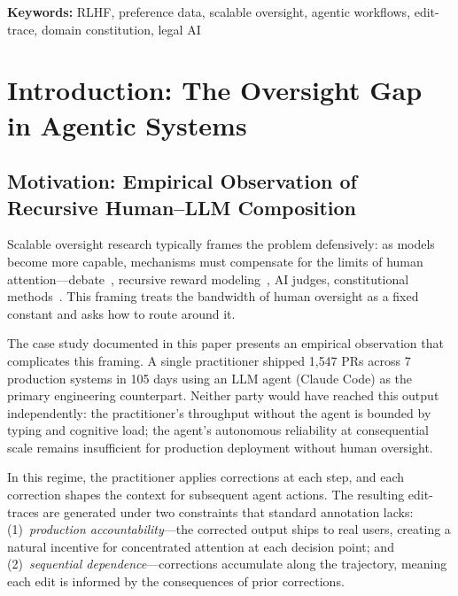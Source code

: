\documentclass[11pt]{article}
\begin{document}
\begin{abstract}
The methodology rests on a simple empirical claim: a single practitioner working recursively with an LLM, under product accountability, completes long-horizon work that neither party completes alone.
Edit-traces in this regime are dense, outcome-validated, and impossible to obtain through annotation in isolation.
\end{abstract}

\vspace{0.5em}
\noindent\textbf{Keywords:} RLHF, preference data, scalable oversight, agentic workflows, edit-trace, domain constitution, legal AI

\section{Introduction: The Oversight Gap in Agentic Systems}
\label{sec:intro}

\subsection{Motivation: Empirical Observation of Recursive Human--LLM Composition}
\label{sec:motivation}

Scalable oversight research typically frames the problem defensively: as models become more capable, mechanisms must compensate for the limits of human attention---debate~\citep{irving2018ai}, recursive reward modeling~\citep{leike2018scalable}, AI judges, constitutional methods~\citep{christiano2017deep, bai2022constitutional}.
This framing treats the bandwidth of human oversight as a fixed constant and asks how to route around it.

The case study documented in this paper presents an empirical observation that complicates this framing.
A single practitioner shipped 1{,}547 PRs across 7 production systems in 105 days using an LLM agent (Claude Code) as the primary engineering counterpart.
Neither party would have reached this output independently: the practitioner's throughput without the agent is bounded by typing and cognitive load; the agent's autonomous reliability at consequential scale remains insufficient for production deployment without human oversight.

In this regime, the practitioner applies corrections at each step, and each correction shapes the context for subsequent agent actions.
The resulting edit-traces are generated under two constraints that standard annotation lacks:
(1)~\emph{production accountability}---the corrected output ships to real users, creating a natural incentive for concentrated attention at each decision point; and
(2)~\emph{sequential dependence}---corrections accumulate along the trajectory, meaning each edit is informed by the consequences of prior corrections.
\end{document}
